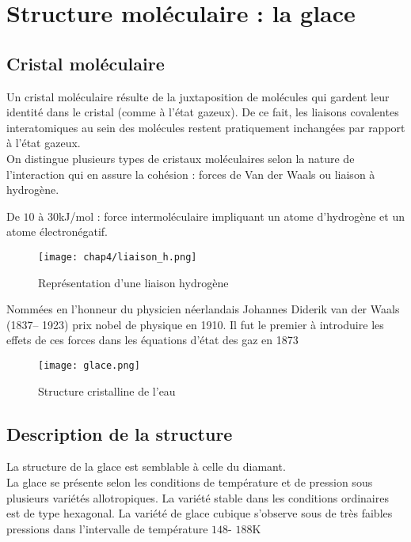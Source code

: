 \section{Structure moléculaire : la glace}
\subsection*{Cristal moléculaire}
Un cristal moléculaire résulte de la juxtaposition de molécules
qui gardent leur identité dans le cristal (comme à l'état gazeux).
De ce fait, les liaisons covalentes interatomiques au sein des
molécules restent pratiquement inchangées par rapport à l'état
gazeux.\\
On distingue plusieurs types de cristaux moléculaires selon la
nature de l'interaction qui en assure la cohésion :
forces de Van der Waals ou liaison à hydrogène.

\begin{rem}
    De $10$ à $30$kJ/mol : force intermoléculaire impliquant un
    atome d'hydrogène et un atome électronégatif.
\end{rem}
\begin{figure}
    \centering
    \texttt{[image: chap4/liaison\_h.png]}
    \caption{Représentation d'une liaison
        hydrogène}\label{fig:4_liason_h}
\end{figure}
\begin{rem}
    Nommées en l'honneur du physicien néerlandais Johannes
    Diderik van der Waals (1837\--- 1923) prix nobel de
    physique en 1910. Il fut le premier à introduire les
    effets de ces forces dans les équations d'état des gaz
    en 1873
\end{rem}
\begin{figure}
    \centering
    \texttt{[image: glace.png]}
    \caption{Structure cristalline de l'eau}\label{fig:glace}
\end{figure}

\subsection{Description de la structure}
La structure de la glace est semblable à celle du diamant.\\
La glace se présente selon les conditions de température et
de pression sous plusieurs variétés allotropiques.
La variété stable dans les conditions ordinaires est
de type hexagonal. La variété de glace cubique s’observe
sous de très faibles pressions dans l’intervalle de
température $148$\-- $188$K


